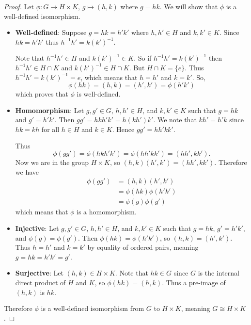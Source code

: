 \begin{proof}
    Let $\phi: G \to H \times K$, $g \mapsto (h, k)$ where $g = hk$. We will show that $\phi$ is a well-defined isomorphism.
    \begin{itemize}
        \item \textbf{Well-defined}: Suppose $g = hk = h'k'$ where $h, h' \in H$ and $k, k' \in K$. Since $hk = h'k'$ thus $h^{-1}h' = k(k')^{-1}$.

        Note that $h^{-1}h' \in H$ and $k(k')^{-1} \in K$. So if $h^{-1}h' = k(k')^{-1}$ then $h^{-1}h' \in H \cap K$ and $k(k')^{-1} \in H \cap K$. But $H \cap K = \{e\}$. Thus $h^{-1}h' = k(k')^{-1} = e$, which means that $h = h'$ and $k = k'$. So,
        \[
            \phi(hk) = (h, k) = (h', k') = \phi(h'k')
        \]
        which proves that $\phi$ is well-defined.

        \item \textbf{Homomorphism}: Let $g, g' \in G$, $h, h' \in H$, and $k, k' \in K$ such that $g = hk$ and $g' = h'k'$. Then $gg' = hkh'k' = h(kh')k'$. We note that $kh' = h'k$ since $hk = kh$ for all $h \in H$ and $k \in K$. Hence $gg' = hh'kk'$.

        Thus
        \[
            \phi(gg') = \phi(hkh'k') = \phi(hh'kk') = (hh', kk').
        \]
        Now we are in the group $H \times K$, so $(h, k)(h', k') = (hh', kk')$. Therefore we have
        \begin{align*}
            \phi(gg') &= (h,k)(h',k')\\
            &= \phi(hk)\phi(h'k')\\
            &= \phi(g)\phi(g')
        \end{align*}
        which means that $\phi$ is a homomorphism.

        \item \textbf{Injective}: Let $g, g' \in G$, $h, h' \in H$, and $k, k' \in K$ such that $g = hk$, $g' = h'k'$, and $\phi(g) = \phi(g')$. Then $\phi(hk) = \phi(h'k')$, so $(h,k) = (h',k')$. Thus $h = h'$ and $k = k'$ by equality of ordered pairs, meaning $g = hk = h'k' = g'$.

        \item \textbf{Surjective}: Let $(h, k) \in H \times K$. Note that $hk \in G$ since $G$ is the internal direct product of $H$ and $K$, so $\phi(hk) = (h, k)$. Thus a pre-image of $(h, k)$ is $hk$.
    \end{itemize}
    Therefore $\phi$ is a well-defined isomorphism from $G$ to $H \times K$, meaning $G \cong H \times K$.
\end{proof}

